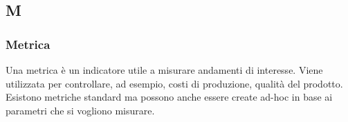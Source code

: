 \subsection*{M}

    \subsubsection*{Metrica}

        Una metrica è un indicatore utile a misurare andamenti di interesse.
        Viene utilizzata per controllare, ad esempio, costi di produzione, qualità del prodotto.
        Esistono metriche standard ma possono anche essere create ad-hoc in base ai parametri che si vogliono misurare.